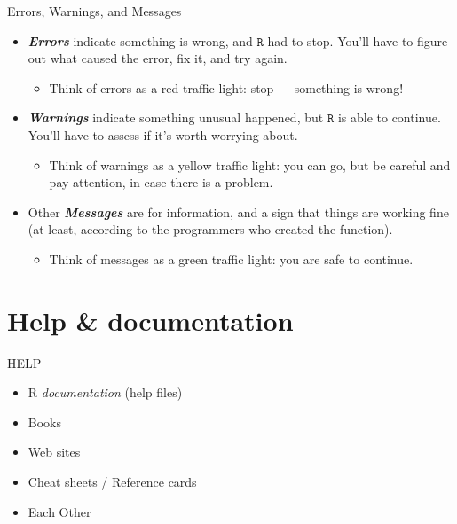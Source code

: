 \documentclass[
  11pt,
  ignorenonframetext,
]{beamer}
\providecommand{\tightlist}{%
  \setlength{\itemsep}{0pt}\setlength{\parskip}{0pt}}
\begin{document}
\begin{frame}{Errors, Warnings, and Messages}
\protect\hypertarget{errors-warnings-and-messages-1}{}
\begin{itemize}
\item
  \textbf{\emph{Errors}} indicate something is wrong, and \(\texttt{R}\)
  had to stop. You'll have to figure out what caused the error, fix it,
  and try again.

  \begin{itemize}
  \tightlist
  \item
    \textcolor[rgb]{0.8,0,0}{Think of errors as a red traffic light: stop --- something is wrong!
    }
  \end{itemize}
\item
  \textbf{\emph{Warnings}} indicate something unusual happened, but
  \(\texttt{R}\) is able to continue. You'll have to assess if it's
  worth worrying about.

  \begin{itemize}
  \tightlist
  \item
    \textcolor[rgb]{0.9,0.7,0}{Think of warnings as a yellow traffic light: you can go, but be careful and pay attention, in case there is a problem.
    }
  \end{itemize}
\item
  Other \textbf{\emph{Messages}} are for information, and a sign that
  things are working fine (at least, according to the programmers who
  created the function).

  \begin{itemize}
  \tightlist
  \item
    \textcolor[rgb]{0,0.6,0}{Think of messages as a green traffic light: you are safe to continue.}
  \end{itemize}
\end{itemize}

\end{frame}

\hypertarget{help-documentation}{%
\section{Help \& documentation}\label{help-documentation}}

\begin{frame}{HELP}
\protect\hypertarget{help}{}
\begin{itemize}
\item
  R \emph{documentation} (help files)
\item
  Books
\item
  Web sites
\item
  Cheat sheets / Reference cards
\item
  Each Other
\end{itemize}
\end{frame}
\end{document}
